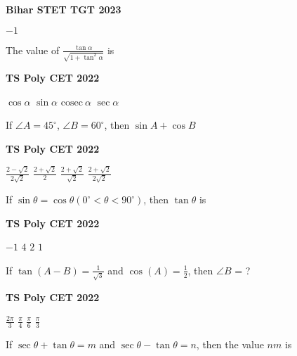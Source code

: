 \documentclass[11pt,paper=a4,answers]{exam}
\begin{document}
\begin{multicols}{2}
\begin{questions}
\begin{flushright}
\small\textbf{Bihar STET TGT 2023}
\end{flushright}


\begin{choices}
\choice $-1$
\end{choices}
\question The value of $\displaystyle \frac{\tan \alpha}{\sqrt{1+ \tan^2 \alpha} }  $ is
\begin{flushright}
\small\textbf{TS Poly CET 2022}
\end{flushright}


\begin{choices}
\choice $\displaystyle \cos \alpha$
\choice $\displaystyle \sin \alpha$
\choice $\displaystyle \textrm{cosec} \ \alpha$ 
\choice $\displaystyle \sec \alpha$
\end{choices}


\question If $\angle A=45^{\circ}$, $\angle B=60^{\circ}$, then $\sin A + \cos B$
\begin{flushright}
\small\textbf{TS Poly CET 2022}
\end{flushright}
\begin{choices}
\choice $\displaystyle \frac{2-\sqrt{2}}{2\sqrt{2}}$
\choice $\displaystyle \frac{2+\sqrt{2}}{{2}}$
\choice $\displaystyle \frac{2+\sqrt{2}}{\sqrt{2}}$
\choice $\displaystyle \frac{2+\sqrt{2}}{2\sqrt{2}}$
\end{choices}
\question 
If $\sin  \theta = \cos \theta \left(0^{\circ} < \theta < 90^{\circ}  \right)$, then $\tan \theta$ is
\begin{flushright}
\small\textbf{TS Poly CET 2022}
\end{flushright}


\begin{choices}
\choice $\displaystyle -1$ 
\choice $\displaystyle 4$ 
\choice $\displaystyle 2$ 
\choice $\displaystyle 1$  
\end{choices}
\columnbreak
\question If $\displaystyle \tan  \left(A-B \right) = \frac{1}{\sqrt{3}}$ and $\displaystyle \cos  \left(A \right) = \frac{1}{2}$, then $\angle B $ = ?
\begin{flushright}
\small\textbf{TS Poly CET 2022}
\end{flushright}

\begin{choices}
\choice $\displaystyle \frac{2 \pi }{3}$ 
\choice $\displaystyle \frac{\pi}{4}$
\choice $\displaystyle \frac{\pi}{6}$
 \choice $\displaystyle \frac{\pi}{3}$  
\end{choices}
\question If $\sec \theta + \tan  \theta = m$ and $\sec \theta - \tan  \theta = n$, then the value $nm$ is


\end{questions}
\end{multicols}
\end{document}
